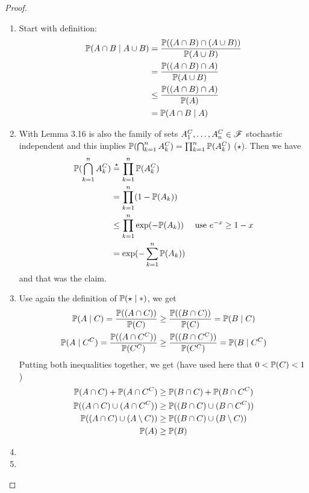 \begin{proof}\
	\begin{enumerate}
		\item Start with definition:
		\begin{align*}
			\mathbb{P}(A \cap B \mid A \cup B) &= \frac{\mathbb{P}((A\cap B)\cap (A \cup B))}{\mathbb{P}(A \cup B)}\\
			&= \frac{\mathbb{P}((A\cap B)\cap A)}{\mathbb{P}(A \cup B)}\\
			&\le \frac{\mathbb{P}((A\cap B)\cap A)}{\mathbb{P}(A)}\\
			&= \mathbb{P}(A\cap B \mid A)
		\end{align*}
		\item With Lemma 3.16 is also the family of sets $A^C_1 , \dots, A^C_n \in \mathscr{F}$ stochastic independent and this implies $\mathbb{P}(\bigcap_{k=1}^n A_k^C) = \prod_{k=1}^{n} \mathbb{P}(A_k^C)$ ($\star$). Then we have
		\begin{align*}
			\mathbb{P}(\bigcap_{k=1}^n A^C_k) &\overset{\star}{=} \prod_{k=1}^n \mathbb{P}(A_k^C)\\
			&= \prod_{k=1}^n (1-\mathbb{P}(A_k))\\
			&\le \prod_{k=1}^n \exp(-\mathbb{P}(A_k)) \quad \text{ use $e^{-x} \ge 1 - x$}\\
			&= \exp(-\sum_{k=1}^n \mathbb{P}(A_k))
		\end{align*}
		and that was the claim.
		\item Use again the definition of $\mathbb{P}(\star \mid \ast)$, we get
		\begin{align*}
			\mathbb{P}(A \mid C) = \frac{\mathbb{P}((A\cap C))}{\mathbb{P}(C)} &\ge \frac{\mathbb{P}((B\cap C))}{\mathbb{P}(C)} = \mathbb{P}(B\mid C)\\
			\mathbb{P}(A \mid C^C) = \frac{\mathbb{P}((A\cap C^C))}{\mathbb{P}(C^C)} &\ge \frac{\mathbb{P}((B\cap C^C))}{\mathbb{P}(C^C)} = \mathbb{P}(B\mid C^C)
		\end{align*}
		Putting both inequalities together, we get (have used here that $0 <\mathbb{P}(C)<1$)
		\begin{align*}
			\mathbb{P}(A \cap C) + \mathbb{P}(A \cap C^C) &\ge \mathbb{P}(B \cap C) + \mathbb{P}(B \cap C^C)\\
			\mathbb{P}((A \cap C) \cup (A \cap C^C)) &\ge \mathbb{P}((B \cap C) \cup (B \cap C^C))\\
			\mathbb{P}((A \cap C) \cup (A \setminus C)) &\ge \mathbb{P}((B \cap C) \cup (B \setminus C))\\
			\mathbb{P}(A) &\ge \mathbb{P}(B)
		\end{align*}
		\item %
		\item %
	\end{enumerate}
\end{proof}

